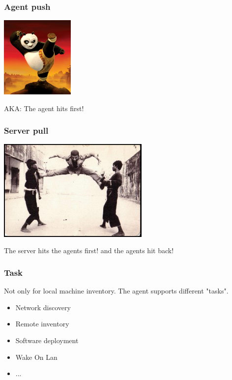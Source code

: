 \begin{frame}
    \frametitle{Agent push}


    \includegraphics[height=4.0cm]{pics/kung-fu-panda.jpg}


    AKA: The agent hits first!

\end{frame}

\begin{frame}
    \frametitle{Server pull}

    \includegraphics[height=5.0cm]{pics/double-kick.jpg}


    The server hits the agents first! \small{and the agents hit back!}

\end{frame}

\begin{frame}
    \frametitle{Task}
    Not only for local machine inventory. The agent supports different "tasks".

    \pause
    \begin{itemize}

        \item Network discovery
        \item Remote inventory
        \item Software deployment
        \item Wake On Lan
        \item ...
    \end{itemize}
\end{frame}

